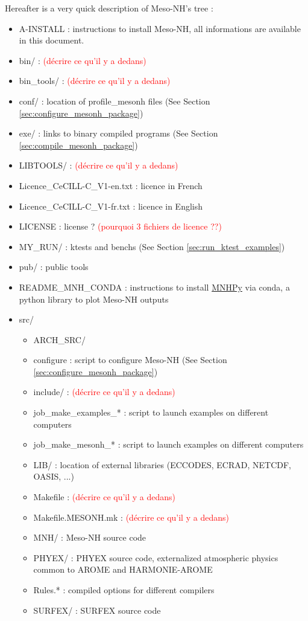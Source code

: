 Hereafter is a very quick description of Meso-NH's tree :
\begin{itemize}
\item A-INSTALL : instructions to install Meso-NH,  all informations are available in this document.
\item bin/ : \textcolor{red}{(décrire ce qu'il y a dedans)}
\item bin\_tools/ : \textcolor{red}{(décrire ce qu'il y a dedans)}
\item conf/ : location of profile\_mesonh files (See Section \ref{sec:configure_mesonh_package})
\item exe/ : links to binary compiled programs (See Section \ref{sec:compile_mesonh_package})
\item LIBTOOLS/ : \textcolor{red}{(décrire ce qu'il y a dedans)}
\item Licence\_CeCILL-C\_V1-en.txt : licence in French
\item Licence\_CeCILL-C\_V1-fr.txt : licence in English
\item LICENSE : license ? \textcolor{red}{(pourquoi 3 fichiers de licence ??)}
\item MY\_RUN/ : ktests and benchs  (See Section \ref{sec:run_ktest_examples})
\item pub/ : public tools
\item README\_MNH\_CONDA : instructions to install \href{https://github.com/QuentinRodier/MNHPy}{MNHPy} via conda, a python library to plot Meso-NH outputs
\item src/
\begin{itemize}
\item ARCH\_SRC/ 
\item configure : script to configure Meso-NH (See Section \ref{sec:configure_mesonh_package})
\item include/ : \textcolor{red}{(décrire ce qu'il y a dedans)}
\item job\_make\_examples\_* : script to launch examples on different computers
\item job\_make\_mesonh\_* : script to launch examples on different computers
\item LIB/ : location of external libraries (ECCODES, ECRAD, NETCDF, OASIS, ...)
\item Makefile : \textcolor{red}{(décrire ce qu'il y a dedans)}
\item Makefile.MESONH.mk : \textcolor{red}{(décrire ce qu'il y a dedans)}
\item MNH/ : Meso-NH source code
\item PHYEX/ : PHYEX source code, externalized atmospheric physics common to AROME and HARMONIE-AROME
\item Rules.* : compiled options for different compilers
\item SURFEX/ : SURFEX source code
\end{itemize}
\end{itemize}

